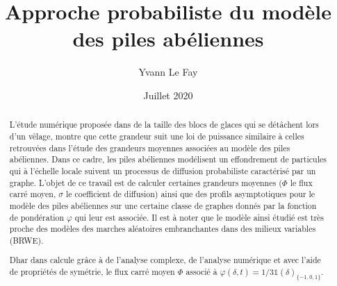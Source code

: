 \documentclass{article}
\theoremstyle{definition}
\begin{document}
\title{Approche probabiliste du modèle des piles abéliennes}
\author{Yvann Le Fay}
\date{Juillet 2020}
\maketitle
\begin{abstract}
	L'étude numérique proposée dans \cite{TGCCS} de la taille des blocs de glaces qui se détâchent lors d'un vêlage, montre que cette grandeur suit une loi de puissance similaire à celles retrouvées dans l'étude des grandeurs moyennes associées au modèle des piles abéliennes. Dans ce cadre, les piles abéliennes modélisent un effondrement de particules qui à l'échelle locale suivent un processus de diffusion probabiliste caractérisé par un graphe. 	
	L'objet de ce travail est de calculer certaines grandeurs moyennes ($\Phi$ le flux carré moyen, $\sigma$ le coefficient de diffusion) ainsi que des profils asymptotiques pour le modèle des piles abéliennes sur une certaine classe de graphes donnés par la fonction de pondération $\varphi$ qui leur est associée. Il est à noter que le modèle ainsi étudié est très proche des modèles des marches aléatoires embranchantes dans des milieux variables (BRWE).
	
	Dhar dans \cite{DHARBIS} calcule grâce à de l'analyse complexe, de l'analyse numérique et avec l'aide de propriétés de symétrie, le flux carré moyen $\Phi$ associé à $\varphi(\delta,t)=1/3\mathds{1}(\delta)_{\{-1,0,1\}}$.    
	

\end{abstract}
\end{document}
